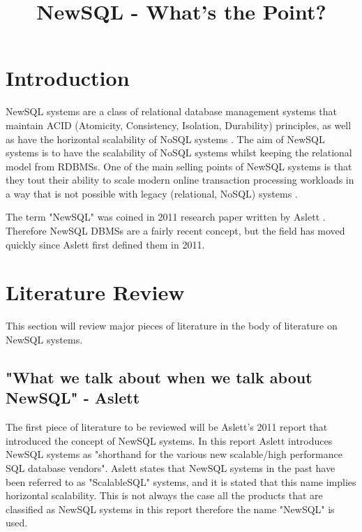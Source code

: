 \documentclass[10pt, conference]{IEEEtran}
\begin{document}
\title{NewSQL - What's the Point?}
\author{
}
\maketitle


\section{Introduction}

NewSQL systems are a class of relational database management systems that maintain ACID (Atomicity, Consistency, Isolation, Durability)  principles, as well as have the horizontal scalability of NoSQL systems \cite{pavlo}. The aim of NewSQL systems is to have the scalability of NoSQL systems whilst keeping the relational model from RDBMSs. One of the main selling points of NewSQL systems is that they tout their ability to scale modern online transaction processing workloads in a way that is not possible with legacy (relational, NoSQL) systems \cite{pavlo}.

The term "NewSQL" was coined in 2011 research paper written by Aslett \cite{aslett}. Therefore NewSQL DBMSs are a fairly recent concept, but the field has moved quickly since Aslett first defined them in 2011.


\section{Literature Review}

This section will review major pieces of literature in the body of literature on NewSQL systems.

\subsection{"What we talk about when we talk about NewSQL" - Aslett}

The first piece of literature to be reviewed will be Aslett's 2011 report \cite{aslett} that introduced the concept of NewSQL systems. In this report Aslett introduces NewSQL systems as "shorthand for the various new scalable/high performance SQL database vendors". Aslett states that NewSQL systems in the past have been referred to as "ScalableSQL" systems, and it is stated that this name implies horizontal scalability. This is not always the case all the products that are classified as NewSQL systems in this report therefore the name "NewSQL" is used. 
\end{document}
